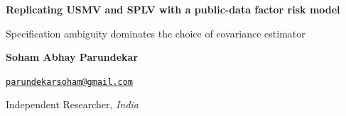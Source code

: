 \documentclass[11pt,letterpaper]{article}
\providecommand{\SohamLocation}{\textit{India}}
\renewcommand{\arraystretch}{1.12}
\begin{document}
\thispagestyle{plain}
\begin{center}
{\LARGE\bfseries Replicating USMV and SPLV with a public-data factor risk
model\par}
\vspace{7pt}
{\large Specification ambiguity dominates the choice of covariance
estimator\par}
\vspace{14pt}

\begingroup
\setlength{\tabcolsep}{5pt}
\renewcommand{\arraystretch}{1.0}
\newcommand{\AuthorBlock}[3]{%
  {\fontsize{10.1}{11.7}\selectfont\bfseries #1\par}%
  \vspace{1.5pt}%
  {\fontsize{8.0}{9.4}\selectfont\href{mailto:#2}{\nolinkurl{#2}}\par}%
  \vspace{1.0pt}%
  {\fontsize{8.5}{10.0}\selectfont Independent Researcher, #3\par}%
}
\AuthorBlock{Soham Abhay Parundekar}{parundekarsoham@gmail.com}{\SohamLocation}
\endgroup
\end{center}

















\begingroup
\small
\setlength{\bibsep}{4pt}

\endgroup

\appendix



\end{document}

